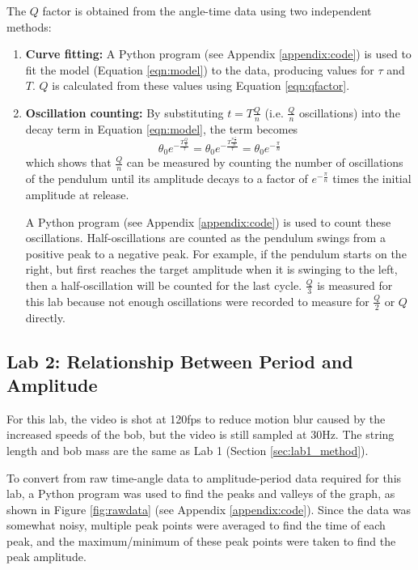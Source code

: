 \documentclass[aps,twocolumn,secnumarabic,nobalancelastpage,amsmath,amssymb,nofootinbib,floatfix,letterpaper]{revtex4}
\begin{document}
The \(Q\) factor is obtained from the angle-time data using two independent methods:
\begin{enumerate}
    \item
        \textbf{Curve fitting:} A Python program (see Appendix \ref{appendix:code}) is used to fit the model (Equation
        \ref{eqn:model}) to the data, producing values for \(\tau\) and \(T\). \(Q\) is calculated from these values
        using Equation \ref{eqn:qfactor}.
    \item
        \textbf{Oscillation counting:} By substituting \(t = T\frac{Q}{n}\) (i.e. \(\frac{Q}{n}\) oscillations) into
        the decay term in Equation \ref{eqn:model}, the term becomes
        \begin{equation}
            \theta_0 e^{-\frac{T\frac{Q}{n}}{\tau}} = \theta_0 e^{-\frac{T\frac{\pi\frac{\tau}{T}}{n}}{\tau}} = \theta_0 e^{-\frac{\pi}{n}}
        \end{equation}
        which shows that \(\frac{Q}{n}\) can be measured by counting the number of oscillations of the pendulum until
        its amplitude decays to a factor of \(e^{-\frac{\pi}{n}}\) times the initial amplitude at release.
        
        A Python program (see Appendix \ref{appendix:code}) is used to count these oscillations. Half-oscillations are
        counted as the pendulum swings from a positive peak to a negative peak. For example, if the pendulum starts on
        the right, but first reaches the target amplitude when it is swinging to the left, then a half-oscillation will
        be counted for the last cycle. \(\frac{Q}{3}\) is measured for this lab because not enough oscillations were
        recorded to measure for \(\frac{Q}{2}\) or \(Q\) directly.
\end{enumerate}

\subsection{Lab 2: Relationship Between Period and Amplitude}
\label{sec:lab2_method}

For this lab, the video is shot at 120fps to reduce motion blur caused by the increased speeds of the bob, but the video
is still sampled at 30Hz. The string length and bob mass are the same as Lab 1 (Section \ref{sec:lab1_method}).

To convert from raw time-angle data to amplitude-period data required for this lab, a Python program was used to find
the peaks and valleys of the graph, as shown in Figure \ref{fig:rawdata} (see Appendix \ref{appendix:code}).
Since the data was somewhat noisy, multiple peak points were averaged to find the time of each peak, and the
maximum/minimum of these peak points were taken to find the peak amplitude.
\end{document}
